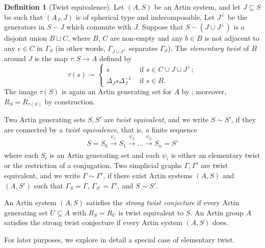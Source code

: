 \documentclass[svgnames]{amsart}
\theoremstyle{plain}
\theoremstyle{definition}
\newtheorem{defn}[thm]{Definition}
\begin{document}
\begin{defn}[Twist equivalence]\label{defn:twist_eq}
    Let $(A,S)$ be an Artin system, and let $J\subseteq S$ be such that $(A_J,J)$ is of spherical type and indecomposable. Let $J^\bot$ be the generators in $S-J$ which commute with $J$. Suppose that $S-(J\cup J^\bot)$ is a disjoint union $B\sqcup C$, where $B$, $C$ are non-empty and any $b\in B$ is not adjacent to any $c\in C$ in $\Gamma_S$ (in other words, $\Gamma_{J\cup J^\bot}$ separates $\Gamma_S$). The \emph{elementary twist} of $B$ around $J$ is the map $\tau \colon S \rightarrow A$ defined by
    $$\tau(s)\coloneq\begin{cases}
        s & \mbox{ if }s\in C\cup J\cup J^\bot;\\
        \Delta_J s \Delta_J^{-1} & \mbox{ if }s\in B.
    \end{cases}$$
    The image $\tau(S)$ is again an Artin generating set for $A$ by \cite[Theorem 4.5]{BMMNtwistconjecture}; moreover, $R_S=R_{\tau(S)}$ by construction. 

    Two Artin generating sets $S, S'$ are \emph{twist equivalent}, and we write $S\sim S'$, if they are connected by a \emph{twist equivalence}, that is, a finite sequence $$S=S_0\xrightarrow[]{\psi_1}S_1\xrightarrow[]{\psi_2}\ldots\xrightarrow[]{\psi_n}S_n=S'$$
    where each $S_i$ is an Artin generating set and each $\psi_i$ is either an elementary twist or the restriction of a conjugation. Two simplicial graphs $\Gamma,\Gamma'$ are twist equivalent, and we write $\Gamma\sim\Gamma'$, if there exist Artin systems $(A,S)$ and $(A,S')$ such that $\Gamma_S=\Gamma$, $\Gamma_{S'}=\Gamma'$, and $S\sim S'$.

    An Artin system $(A,S)$ satisfies the \emph{strong twist conjecture} if every Artin generating set $U \subseteq A$ with $R_S=R_U$ is twist equivalent to $S$. An Artin group $A$ satisfies the strong twist conjecture if every Artin system $(A,S)$ does.
\end{defn}


\noindent For later purposes, we explore in detail a special case of elementary twist.
\end{document}
